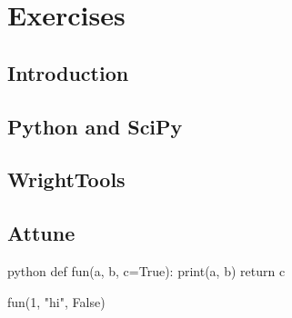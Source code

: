 \chapter{Exercises} \label{cha:exer}

\clearpage

\section{Introduction}  %

\clearpage

\section{Python and SciPy}  %

\section{WrightTools}  %

\section{Attune}  %


\begin{codefragment}{python}
def fun(a, b, c=True):
  print(a, b)
  return c

fun(1, "hi", False)
\end{codefragment}


\clearpage
